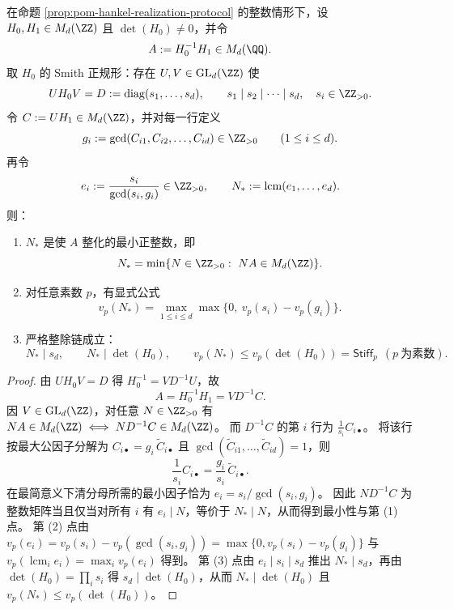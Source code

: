 \begin{theorem}\label{thm:pom-hankel-smith-minimal-denominator}
在命题 \ref{prop:pom-hankel-realization-protocol} 的整数情形下，设 \(H_0,H_1\in M_d(\ZZ)\) 且 \(\det(H_0)\neq 0\)，并令
\[
A:=H_0^{-1}H_1\in M_d(\QQ).
\]
取 \(H_0\) 的 Smith 正规形：存在 \(U,V\in \mathrm{GL}_d(\ZZ)\) 使
\[
U H_0 V=D:=\mathrm{diag}(s_1,\dots,s_d),
\qquad
s_1\mid s_2\mid\cdots\mid s_d,\quad s_i\in\ZZ_{>0}.
\]
令 \(C:=U H_1\in M_d(\ZZ)\)，并对每一行定义
\[
g_i:=\gcd(C_{i1},C_{i2},\dots,C_{id})\in\ZZ_{>0}\qquad(1\le i\le d).
\]
再令
\[
e_i:=\frac{s_i}{\gcd(s_i,g_i)}\in\ZZ_{>0},
\qquad
N_\ast:=\operatorname{lcm}(e_1,\dots,e_d).
\]
则：
\begin{enumerate}
  \item \(N_\ast\) 是使 \(A\) 整化的最小正整数，即
  \[
  N_\ast=\min\{N\in\ZZ_{>0}:\ NA\in M_d(\ZZ)\}.
  \]
  \item 对任意素数 \(p\)，有显式公式
  \[
  v_p(N_\ast)=\max_{1\le i\le d}\max\{0,\ v_p(s_i)-v_p(g_i)\}.
  \]
  \item 严格整除链成立：
  \[
  N_\ast\mid s_d,
  \qquad
  N_\ast\mid \det(H_0),
  \qquad
  v_p(N_\ast)\le v_p(\det(H_0))=\mathsf{Stiff}_p\ \ (p\ \text{为素数}).
  \]
\end{enumerate}
\end{theorem}
\begin{proof}
由 \(U H_0 V=D\) 得 \(H_0^{-1}=V D^{-1}U\)，故
\[
A=H_0^{-1}H_1=V D^{-1}C.
\]
因 \(V\in \mathrm{GL}_d(\ZZ)\)，对任意 \(N\in\ZZ_{>0}\) 有
\(
NA\in M_d(\ZZ)\iff N D^{-1}C\in M_d(\ZZ)
\)。
而 \(D^{-1}C\) 的第 \(i\) 行为 \(\frac{1}{s_i}C_{i\bullet}\)。
将该行按最大公因子分解为 \(C_{i\bullet}=g_i\,\widetilde C_{i\bullet}\) 且 \(\gcd(\widetilde C_{i1},\dots,\widetilde C_{id})=1\)，则
\[
\frac{1}{s_i}C_{i\bullet}=\frac{g_i}{s_i}\,\widetilde C_{i\bullet}.
\]
在最简意义下清分母所需的最小因子恰为 \(e_i=s_i/\gcd(s_i,g_i)\)。
因此 \(N D^{-1}C\) 为整数矩阵当且仅当对所有 \(i\) 有 \(e_i\mid N\)，等价于 \(N_\ast\mid N\)，从而得到最小性与第 (1) 点。
第 (2) 点由
\(
v_p(e_i)=v_p(s_i)-v_p(\gcd(s_i,g_i))=\max\{0,v_p(s_i)-v_p(g_i)\}
\)
与 \(v_p(\operatorname{lcm}_i e_i)=\max_i v_p(e_i)\) 得到。
第 (3) 点由 \(e_i\mid s_i\mid s_d\) 推出 \(N_\ast\mid s_d\)，再由 \(\det(H_0)=\prod_i s_i\) 得 \(s_d\mid \det(H_0)\)，从而 \(N_\ast\mid \det(H_0)\) 且 \(v_p(N_\ast)\le v_p(\det(H_0))\)。
\end{proof}

